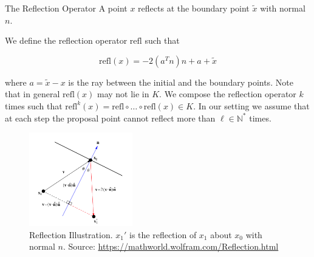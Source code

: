 \documentclass{beamer}
\begin{document}
\begin{frame}[allowframebreaks]{The Reflection Operator}
    A point $x$ reflects at the boundary point $\tilde x$ with normal $n$.
    
    \medskip
    
    We define the reflection operator $\textrm{refl}$ such that 
    
    $$
    \textrm{refl}(x) = - 2 (a^T n) n + a + \tilde x
    $$

    where $a = \tilde x - x$ is the ray between the initial and the boundary points. Note that in general $\textrm{refl}(x)$ may not lie in $K$. We compose the reflection operator $k$ times such that $\textrm{refl}^k (x) = \mathrm {refl} \circ \dots \circ \mathrm{refl} (x) \in K$. In our setting we assume that at each step the proposal point cannot reflect more than $\ell \in \mathbb N^*$ times.

    \framebreak 
    
    \begin{figure}
        \centering
        \includegraphics[width=0.4\textwidth]{publications/presentations/log_concave_sampling/reflection_w.png}
        \caption{Reflection Illustration. $x_1'$ is the reflection of $x_1$ about $x_0$ with normal $n$. Source: \url{https://mathworld.wolfram.com/Reflection.html}}
        \label{fig:my_label}
    \end{figure}
    
\end{frame}
\end{document}
